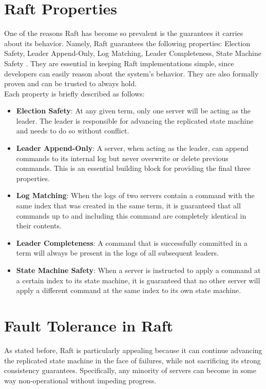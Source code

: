 \section{Raft Properties} \label{raft-properties}

One of the reasons Raft has become so prevalent is the guarantees it carries about its behavior. Namely, Raft guarantees the following properties: Election Safety, Leader Append-Only, Log Matching, Leader Completeness, State Machine Safety \cite{raft}. They are essential in keeping Raft implementations simple, since developers can easily reason about the system's behavior. They are also formally proven \cite{raft} and can be trusted to always hold.\\

Each property is briefly described as follows:
\begin{itemize}
    \item \textbf{Election Safety}: At any given term, only one server will be acting as the leader. The leader is responsible for advancing the replicated state machine and needs to do so without conflict.
    \item \textbf{Leader Append-Only}: A server, when acting as the leader, can append commands to its internal log but never overwrite or delete previous commands. This is an essential building block for providing the final three properties.
    \item \textbf{Log Matching}: When the logs of two servers contain a command with the same index that was created in the same term, it is guaranteed that all commands up to and including this command are completely identical in their contents.
    \item \textbf{Leader Completeness}: A command that is successfully committed in a term will always be present in the logs of all subsequent leaders.
    \item \textbf{State Machine Safety}: When a server is instructed to apply a command at a certain index to its state machine, it is guaranteed that no other server will apply a different command at the same index to its own state machine.
\end{itemize}

\section{Fault Tolerance in Raft}

As stated before, Raft is particularly appealing because it can continue advancing the replicated state machine in the face of failures, while not sacrificing its strong consistency guarantees. Specifically, any minority of servers can become in some way non-operational without impeding progress. \\

